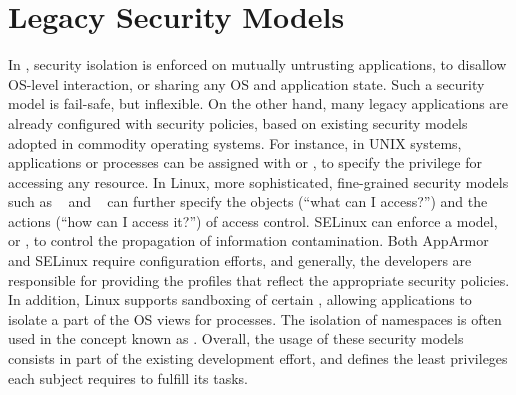 

\section{Legacy Security Models}
\label{sec:future:security}


In \liboses{}, security isolation is enforced on mutually untrusting applications,
to disallow OS-level interaction,
or sharing any OS and application state.
Such a security model is fail-safe, but inflexible.
On the other hand, many legacy applications are already
configured with security policies,
based on existing security models adopted in commodity operating systems.
For instance, in UNIX systems, applications or processes
can be assigned with  or ,
to specify the privilege for accessing any resource.
In Linux, more sophisticated, fine-grained security models
such as ~\citep{apparmor} and ~\citep{selinux}
can further specify the objects (``what can I access?'')
and the actions (``how can I access it?'') of access control.
SELinux can enforce a  model, or ,
to control the propagation of information contamination.
Both AppArmor and SELinux require configuration efforts,
and generally, the developers are responsible for
providing the profiles
that reflect the appropriate security policies.
In addition,
Linux supports sandboxing of certain ,
allowing applications to isolate a part of the OS views for processes.
The isolation of namespaces is often used in the concept known as .
Overall, the usage of these security models consists in
part of the existing development effort,
and defines the least privileges each subject requires
to fulfill its tasks.


